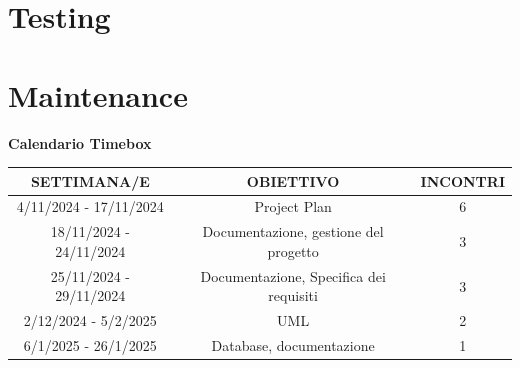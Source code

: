 \documentclass[a4paper,12pt]{article}
\begin{document}
\section{Testing}

\section{Maintenance}


\newpage
\begin{center}
\Huge \textbf{Calendario Timebox}
\end{center}

\begin{center}
\begin{tabular}{|c|c|c|}
\hline
\textbf{SETTIMANA/E} & \textbf{OBIETTIVO} & \textbf{INCONTRI } \\
\hline
4/11/2024 - 17/11/2024 & Project Plan & 6 \\
\hline
18/11/2024 - 24/11/2024 & Documentazione, gestione del progetto & 3 \\
\hline
25/11/2024 - 29/11/2024 & Documentazione, Specifica dei requisiti  & 3 \\
\hline
2/12/2024 - 5/2/2025 & UML & 2 \\
\hline
6/1/2025 - 26/1/2025 & Database, documentazione & 1 \\
\hline

\end{tabular}
\end{center}
\end{document}
